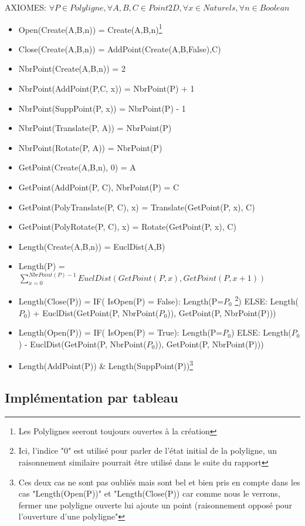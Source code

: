 \documentclass[a4paper, 11pt, oneside]{article}
\begin{document}
\noindent AXIOMES: $\forall P \in Polyligne, \forall A, B, C \in Point2D, \forall x \in Naturels, \forall n \in Boolean$
\begin{itemize}
    \item Open(Create(A,B,n)) = Create(A,B,n)\footnote{Les Polylignes seeront toujours ouvertes à la création}
    \item Close(Create(A,B,n)) = AddPoint(Create(A,B,False),C)
    \item NbrPoint(Create(A,B,n)) = 2
    \item NbrPoint(AddPoint(P,C, x)) = NbrPoint(P) + 1
    \item NbrPoint(SuppPoint(P, x)) = NbrPoint(P) - 1
    \item NbrPoint(Translate(P, A)) = NbrPoint(P)
    \item NbrPoint(Rotate(P, A)) = NbrPoint(P)
    \item GetPoint(Create(A,B,n), 0) = A
    \item GetPoint(AddPoint(P, C), NbrPoint(P) = C
    \item GetPoint(PolyTranslate(P, C), x) =  Translate(GetPoint(P, x), C)
    \item GetPoint(PolyRotate(P, C), x) =  Rotate(GetPoint(P, x), C)
    \item Length(Create(A,B,n)) = EuclDist(A,B)
    \item Length(P) = $\sum_{x=0}^{NbrPoint(P)-1} EuclDist(GetPoint(P,x),GetPoint(P,x+1))$
    \item Length(Close(P)) = IF( IsOpen(P) = False): Length(P=$P_0$ \footnote{Ici, l'indice "0" est utilisé pour parler de l'état initial de la polyligne, un raisonnement similaire pourrait être utilisé dans le suite du rapport})
    ELSE: Length($P_0$) + EuclDist(GetPoint(P, NbrPoint($P_0$)), GetPoint(P, NbrPoint(P)))
    \item Length(Open(P)) = IF( IsOpen(P) = True): Length(P=$P_0$)
    ELSE: Length($P_0$) - EuclDist(GetPoint(P, NbrPoint($P_0$)), GetPoint(P, NbrPoint(P)))
    \item Length(AddPoint(P)) \& Length(SuppPoint(P))\footnote{Ces deux cas ne sont pas oubliés mais sont bel et bien pris en compte dans les cas "Length(Open(P))" et "Length(Close(P)) car comme nous le verrons, fermer une polyligne ouverte lui ajoute un point (raisonnement opposé pour l'ouverture d'une polyligne" }
    
\end{itemize}



\subsection{Implémentation par tableau}
\end{document}
